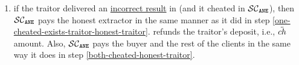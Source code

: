 \begin{itemize}
\begin{enumerate}
\begin{enumerate}[leftmargin=2mm]
\begin{enumerate}
 
%
\item  if the traitor delivered an \underline{incorrect result} in \SCtc (and it cheated in $\mathcal{SC}_{\mathtt{ANE}}$), then $\mathcal{SC}_{\mathtt{ANE}}$ pays the honest extractor in the same manner as it did in step \ref{one-cheated-exists-traitor-honest-traitor}.  
%
%
%
\SCtc refunds the traitor's deposit, i.e., $\ddot{ch}$ amount. 
%
%
%
Also, $\mathcal{SC}_{\mathtt{ANE}}$ pays the buyer and the rest of the clients in the same way it does in step \ref{both-cheated-honest-traitor}.


%
\end{enumerate}


\end{enumerate}

\end{enumerate}
\end{itemize}



%
%
%
%

